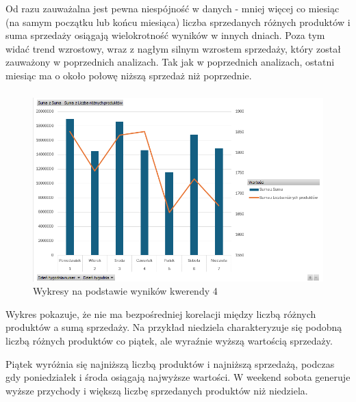 \documentclass[a4paper,12pt]{article}
\begin{document}
Od razu zauważalna jest pewna niespójność w danych - mniej więcej co miesiąc (na samym początku lub końcu miesiąca) liczba sprzedanych różnych produktów i suma sprzedaży osiągają wielokrotność wyników w innych dniach. Poza tym widać trend wzrostowy, wraz z nagłym silnym wzrostem sprzedaży, który został zauważony w poprzednich analizach. Tak jak w poprzednich analizach, ostatni miesiąc ma o około połowę niższą sprzedaż niż poprzednie.

\subsubsection{}

\begin{figure}[H]
    \centering
    \includegraphics[width=1.0\textwidth]{images/excel/04.png}
    \caption{Wykresy na podstawie wyników kwerendy 4}
\end{figure}

Wykres pokazuje, że nie ma bezpośredniej korelacji między liczbą różnych produktów a sumą sprzedaży. Na przykład niedziela charakteryzuje się podobną liczbą różnych produktów co piątek, ale wyraźnie wyższą wartością sprzedaży.

Piątek wyróżnia się najniższą liczbą produktów i najniższą sprzedażą, podczas gdy poniedziałek i środa osiągają najwyższe wartości. W weekend sobota generuje wyższe przychody i większą liczbę sprzedanych produktów niż niedziela.

\subsubsection{}
\end{document}
